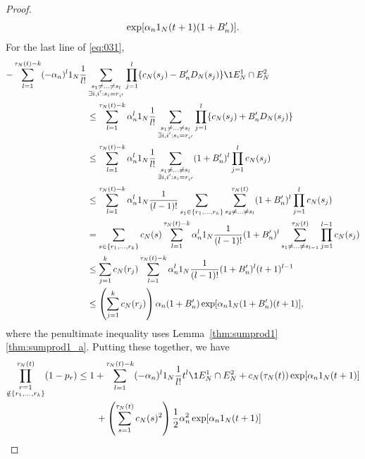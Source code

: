 \begin{proof}
\begin{align*}
        \exp[ \alpha_n 1_N (t+1) (1+B_n^\prime) ] .
\end{align*}
For the last line of \eqref{eq:031},
\begin{align*}
- \sum_{l=1}^{\tau_N(t) -k} (-\alpha_n)^l \ON \frac{1}{l!}
        &\sum_{\substack{s_1\neq\dots\neq s_l \\ \exists i,i^\prime 
        : s_i=r_{i^\prime} }}
        \prod_{j=1}^l \{ c_N(s_j) - B_n^\prime D_N(s_j) \} 
        \1{E_N^1 \cap E_N^2} \\
&\leq \sum_{l=1}^{\tau_N(t) -k} \alpha_n^l \ON \frac{1}{l!}
        \sum_{\substack{s_1\neq\dots\neq s_l \\ \exists i,i^\prime 
        : s_i=r_{i^\prime} }}
        \prod_{j=1}^l \{ c_N(s_j) + B_n^\prime D_N(s_j) \} \\
&\leq \sum_{l=1}^{\tau_N(t) -k} \alpha_n^l \ON \frac{1}{l!}
        \sum_{\substack{s_1\neq\dots\neq s_l \\ \exists i,i^\prime 
        : s_i=r_{i^\prime} }}
        (1 + B_n^\prime)^l \prod_{j=1}^l c_N(s_j) \\
&\leq \sum_{l=1}^{\tau_N(t) -k} \alpha_n^l \ON
        \frac{1}{(l-1)!} \sum_{s_1 \in \{r_1,\dots,r_k\} } 
        \sum_{s_2\neq \dots\neq s_l}^{\tau_N(t)}
        (1 + B_n^\prime)^l \prod_{j=1}^l c_N(s_j) \\
&= \sum_{s \in \{r_1,\dots,r_k\} } c_N(s)
        \sum_{l=1}^{\tau_N(t) -k} \alpha_n^l \ON
        \frac{1}{(l-1)!}  (1 + B_n^\prime)^l
        \sum_{s_1\neq \dots\neq s_{l-1}}^{\tau_N(t)} 
        \prod_{j=1}^{l-1} c_N(s_j) \\
&\leq \sum_{j=1}^k c_N(r_j)
        \sum_{l=1}^{\tau_N(t) -k} \alpha_n^l \ON
        \frac{1}{(l-1)!}  (1 + B_n^\prime)^l (t+1)^{l-1} \\
&\leq \left( \sum_{j=1}^k c_N(r_j) \right)
        \alpha_n (1 + B_n^\prime) 
        \exp[ \alpha_n \ON (1 + B_n^\prime) (t+1) ] ,
\end{align*}
where the penultimate inequality uses Lemma~\ref{thm:sumprod1}\ref{thm:sumprod1_a}.
Putting these together, we have
\begin{align}
\prod_{\substack{r=1 \\ \notin \{r_1,\dots,r_k\} }}^{\tau_N(t)} (1-p_r)
&\leq 1+ \sum_{l=1}^{\tau_N(t) -k} (-\alpha_n)^l \ON \frac{1}{l!} t^l
        \1{E_N^1 \cap E_N^2}
        + c_N(\tau_N(t)) \exp[ \alpha_n \ON (t+1) ] \notag\\
    &\qquad+ \left( \sum_{s=1}^{\tau_N(t)} c_N(s)^2 \right)
        \frac{1}{2} \alpha_n^2 \exp[ \alpha_n \ON (t+1) ] \notag\\

\end{align}
\end{proof}
